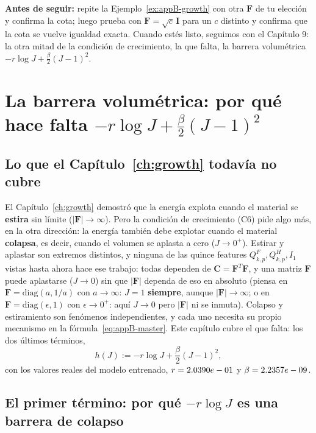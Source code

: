 \documentclass[11pt,a4paper]{article}
\begin{document}
\bigskip
\noindent\textbf{Antes de seguir:} repite la Ejemplo~\ref{ex:appB-growth}
con otra $\bm F$ de tu elecci\'on y confirma la cota; luego prueba con
$\bm F=\sqrt{c}\,\bm I$ para un $c$ distinto y confirma que la cota se
vuelve igualdad exacta. Cuando est\'es listo, seguimos con el
Cap\'itulo 9: la otra mitad de la condici\'on de crecimiento, la que
falta, la barrera volum\'etrica $-r\log J+\tfrac\beta2(J-1)^2$.

\section{La barrera volum\'etrica: por qu\'e hace falta $-r\log J+\tfrac\beta2(J-1)^2$}
\label{ch:volumetric}

\subsection{Lo que el Cap\'itulo~\ref{ch:growth} todav\'ia no cubre}

El Cap\'itulo~\ref{ch:growth} demostr\'o que la energ\'ia explota
cuando el material se \textbf{estira} sin l\'imite ($|\bm F|\to\infty$).
Pero la condici\'on de crecimiento (C6) pide algo m\'as, en la otra
direcci\'on: la energ\'ia tambi\'en debe explotar cuando el material
\textbf{colapsa}, es decir, cuando el volumen se aplasta a cero
($J\to0^+$). Estirar y aplastar son extremos distintos, y ninguna de
las quince features $Q_{k,p}^F,Q_{k,p}^H,I_1$ vistas hasta ahora hace
ese trabajo: todas dependen de $\bm C=\bm F^T\bm F$, y una matriz
$\bm F$ puede aplastarse ($J\to0$) sin que $|\bm F|$ dependa de eso
en absoluto (piensa en $\bm F=\mathrm{diag}(a,1/a)$ con $a\to\infty$: $J=1$
\textbf{siempre}, aunque $|\bm F|\to\infty$; o en
$\bm F=\mathrm{diag}(\epsilon,1)$ con $\epsilon\to0^+$: aqu\'i $J\to0$ pero
$|\bm F|$ ni se inmuta). Colapso y estiramiento son fen\'omenos
independientes, y cada uno necesita su propio mecanismo en la
f\'ormula~\eqref{eq:appB-master}. Este cap\'itulo cubre el que falta:
los dos \'ultimos t\'erminos,
\begin{equation}
 h(J):=-r\log J+\frac\beta2(J-1)^2,
 \label{eq:appB-volumetric-def}
\end{equation}
con los valores reales del modelo entrenado,
$r=2.0390e-01{}$ y $\beta=2.2357e-09{}$.

\subsection{El primer t\'ermino: por qu\'e $-r\log J$ es una barrera de colapso}
\end{document}
